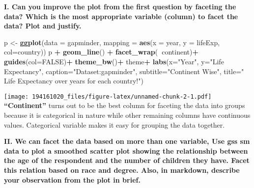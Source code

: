 \documentclass[
]{article}
\newenvironment{Shaded}{\begin{snugshade}}{\end{snugshade}}
\newcommand{\DataTypeTok}[1]{\textcolor[rgb]{0.13,0.29,0.53}{#1}}
\newcommand{\KeywordTok}[1]{\textcolor[rgb]{0.13,0.29,0.53}{\textbf{#1}}}
\newcommand{\NormalTok}[1]{#1}
\newcommand{\OperatorTok}[1]{\textcolor[rgb]{0.81,0.36,0.00}{\textbf{#1}}}
\newcommand{\OtherTok}[1]{\textcolor[rgb]{0.56,0.35,0.01}{#1}}
\newcommand{\StringTok}[1]{\textcolor[rgb]{0.31,0.60,0.02}{#1}}
\begin{document}
\textbf{I. Can you improve the plot from the first question by faceting
the data? Which is the most appropriate variable (column) to facet the
data? Plot and justify.}

\begin{Shaded}
\begin{Highlighting}[]
\NormalTok{p <-}\StringTok{ }\KeywordTok{ggplot}\NormalTok{(}\DataTypeTok{data =}\NormalTok{ gapminder,}
            \DataTypeTok{mapping =} \KeywordTok{aes}\NormalTok{(}\DataTypeTok{x =}\NormalTok{ year,}
                          \DataTypeTok{y =}\NormalTok{ lifeExp, }\DataTypeTok{col=}\NormalTok{country))}
\NormalTok{p }\OperatorTok{+}\StringTok{ }\KeywordTok{geom_line}\NormalTok{() }\OperatorTok{+}\StringTok{ }
\StringTok{  }\KeywordTok{facet_wrap}\NormalTok{(}\OperatorTok{~}\NormalTok{continent)}\OperatorTok{+}
\StringTok{  }\KeywordTok{guides}\NormalTok{(}\DataTypeTok{col=}\OtherTok{FALSE}\NormalTok{)}\OperatorTok{+}
\StringTok{  }\KeywordTok{theme_bw}\NormalTok{()}\OperatorTok{+}
\StringTok{  }\NormalTok{theme}\OperatorTok{+}
\StringTok{  }\KeywordTok{labs}\NormalTok{(}\DataTypeTok{x=}\StringTok{"Year"}\NormalTok{, }\DataTypeTok{y=}\StringTok{"Life Expectancy"}\NormalTok{, }
       \DataTypeTok{caption=}\StringTok{"Dataset:gapminder"}\NormalTok{,}
       \DataTypeTok{subtitle=}\StringTok{"Continent Wise"}\NormalTok{,}
       \DataTypeTok{title=}\StringTok{" Life Expectancy over years for each country!"}\NormalTok{)}
\end{Highlighting}
\end{Shaded}

\texttt{[image: 194161020\_files/figure-latex/unnamed-chunk-2-1.pdf]}
\textbf{``Continent''} turns out to be the best column for faceting the
data into groups because it is categorical in nature while other
remaining columns have continuous values. Categorical variable makes it
easy for grouping the data together.

\textbf{II. We can facet the data based on more than one variable, Use
gss sm data to plot a smoothed scatter plot showing the relationship
between the age of the respondent and the number of children they have.
Facet this relation based on race and degree. Also, in markdown,
describe your observation from the plot in brief.}
\end{document}
